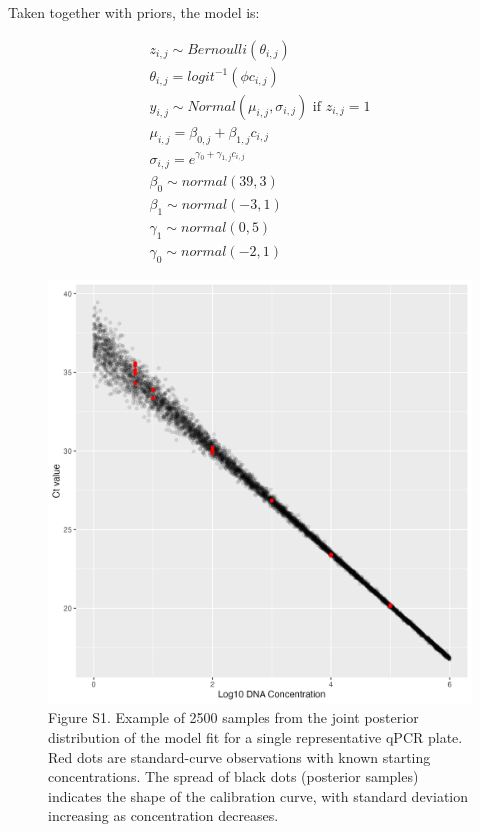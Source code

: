 \documentclass[
]{article}
\begin{document}
Taken together with priors, the model is:

\begin{gather*}
z_{i,j} \sim Bernoulli(\theta_{i,j}) \\
\theta_{i,j} = logit^{-1}(\phi c_{i,j}) \\[4mm]
y_{i,j} \sim Normal(\mu_{i,j}, \sigma_{i,j})   \text{    if } z_{i,j} = 1 \\
\mu_{i,j} = \beta_{0,j} + \beta_{1,j} c_{i,j} \\
\sigma_{i,j} = e^{\gamma_{0}  + \gamma_{1,j} c_{i,j}} \\[4mm]
\beta_{0} \sim normal(39, 3) \\
\beta_{1} \sim normal(-3, 1) \\
\gamma_{1} \sim normal(0,5) \\
\gamma_{0} \sim normal(-2,1)
\end{gather*}

\begin{figure}
\centering
\includegraphics{../Output/SupplementalFigures/qPCR_calibration_supplemental.png}
\caption{Figure S1. Example of 2500 samples from the joint posterior
distribution of the model fit for a single representative qPCR plate.
Red dots are standard-curve observations with known starting
concentrations. The spread of black dots (posterior samples) indicates
the shape of the calibration curve, with standard deviation increasing
as concentration decreases.\label{fig:qpcrmodel}}
\end{figure}
\end{document}

